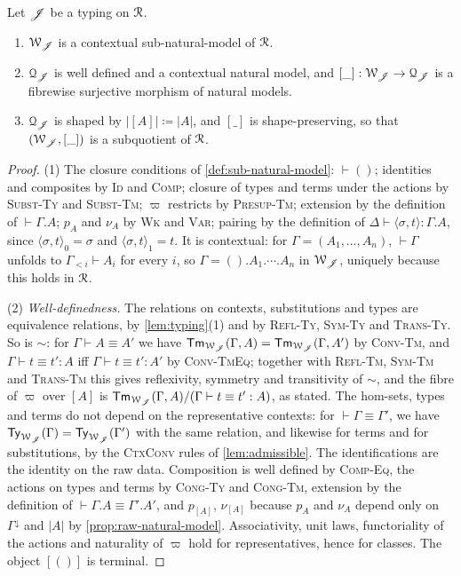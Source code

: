 \begin{proposition}\label{prop:quotient}
    Let $\mathscr{J}$ be a typing on $\mathcal{R}$.
    \begin{enumerate}
        \item $\mathcal{W}_{\mathscr{J}}$ is a contextual sub-natural-model of $\mathcal{R}$.
        \item $\mathcal{Q}_{\mathscr{J}}$ is well defined and a contextual natural model, and $[\_] : \mathcal{W}_{\mathscr{J}} \to \mathcal{Q}_{\mathscr{J}}$ is a fibrewise surjective morphism of natural models.
        \item $\mathcal{Q}_{\mathscr{J}}$ is shaped by $|[A]| \coloneqq |A|$, and $[\_]$ is shape-preserving, so that $(\mathcal{W}_{\mathscr{J}}, [\_])$ is a subquotient of $\mathcal{R}$.
    \end{enumerate}
\end{proposition}

\begin{proof}
    (1) The closure conditions of \cref{def:sub-natural-model}: $\vdash ()$; identities and composites by \textsc{Id} and \textsc{Comp}; closure of types and terms under the actions by \textsc{Subst-Ty} and \textsc{Subst-Tm}; $\varpi$ restricts by \textsc{Presup-Tm}; extension by the definition of $\vdash \Gamma.A$; $p_A$ and $\nu_A$ by \textsc{Wk} and \textsc{Var}; pairing by the definition of $\Delta \vdash \langle \sigma, t \rangle : \Gamma.A$, since $\langle \sigma, t \rangle_0 = \sigma$ and $\langle \sigma, t \rangle_1 = t$. It is contextual: for $\Gamma = (A_1, \ldots, A_n)$, $\vdash \Gamma$ unfolds to $\Gamma_{<i} \vdash A_i$ for every $i$, so $\Gamma = ().A_1.\cdots.A_n$ in $\mathcal{W}_{\mathscr{J}}$, uniquely because this holds in $\mathcal{R}$.

    (2) \emph{Well-definedness.} The relations on contexts, substitutions and types are equivalence relations, by \cref{lem:typing}(1) and by \textsc{Refl-Ty}, \textsc{Sym-Ty} and \textsc{Trans-Ty}. So is $\sim$: for $\Gamma \vdash A \equiv A'$ we have $\mathsf{Tm}_{\mathcal{W}_{\mathscr{J}}}(\Gamma, A) = \mathsf{Tm}_{\mathcal{W}_{\mathscr{J}}}(\Gamma, A')$ by \textsc{Conv-Tm}, and $\Gamma \vdash t \equiv t' : A$ iff $\Gamma \vdash t \equiv t' : A'$ by \textsc{Conv-TmEq}; together with \textsc{Refl-Tm}, \textsc{Sym-Tm} and \textsc{Trans-Tm} this gives reflexivity, symmetry and transitivity of $\sim$, and the fibre of $\varpi$ over $[A]$ is $\mathsf{Tm}_{\mathcal{W}_{\mathscr{J}}}(\Gamma, A)/(\Gamma \vdash t \equiv t' : A)$, as stated. The hom-sets, types and terms do not depend on the representative contexts: for $\vdash \Gamma \equiv \Gamma'$, we have $\mathsf{Ty}_{\mathcal{W}_{\mathscr{J}}}(\Gamma) = \mathsf{Ty}_{\mathcal{W}_{\mathscr{J}}}(\Gamma')$ with the same relation, and likewise for terms and for substitutions, by the \textsc{CtxConv} rules of \cref{lem:admissible}. The identifications are the identity on the raw data. Composition is well defined by \textsc{Comp-Eq}, the actions on types and terms by \textsc{Cong-Ty} and \textsc{Cong-Tm}, extension by the definition of $\vdash \Gamma.A \equiv \Gamma'.A'$, and $p_{[A]}$, $\nu_{[A]}$ because $p_A$ and $\nu_A$ depend only on $\Gamma^{\downarrow}$ and $|A|$ by \cref{prop:raw-natural-model}. Associativity, unit laws, functoriality of the actions and naturality of $\varpi$ hold for representatives, hence for classes. The object $[()]$ is terminal.


\end{proof}
